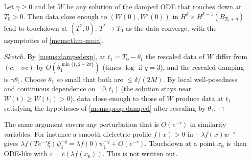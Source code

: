 \begin{corollary}\label{mems:cor-damped}
Let $\gamma\ge0$ and let $W$ be any solution of the damped ODE that touches down at
$T_0>0$. Then data close enough to $(W(0),W'(0))$ in
$H^k\times H^{k-1}(B_{T_0+\eta})$ lead to touchdown at $(T^*,0)$, $T^*\to T_0$ as
the data converge, with the asymptotics of \cref{mems:thm-main}.
\end{corollary}

\begin{proof}[Sketch]
By \eqref{mems:dampedexp}, at $t_1=T_0-\theta_1$ the rescaled data of $W$ differ
from $(c,-\sigma c)$ by $O(\theta_1^{\min\{1,2-2\sigma\}})$ (times $\log$ if $q=3$), and the
rescaled damping is $\gamma\theta_1$. Choose $\theta_1$ so small that both are
$\le\delta/(2M)$. By local well-posedness and continuous dependence on
$[0,t_1]$ (the solution stays near $W(t)\ge W(t_1)>0$), data close enough to
those of $W$ produce data at $t_1$ satisfying the hypotheses of
\cref{mems:prop-damped} after rescaling by $\theta_1$.
\end{proof}

The same argument covers any perturbation that is $O(e^{-\tau})$ in similarity
variables. For instance a smooth dielectric profile $f(x)>0$ in
$-\lambda f(x)w^{-q}$ gives
$\lambda f(Te^{-\tau}\xi)\psi_1^{-q}=\lambda f(0)\psi_1^{-q}+O(e^{-\tau})$.
Touchdown at a point $x_0$ is then ODE-like with $c=c(\lambda f(x_0))$. This is
not written out.

